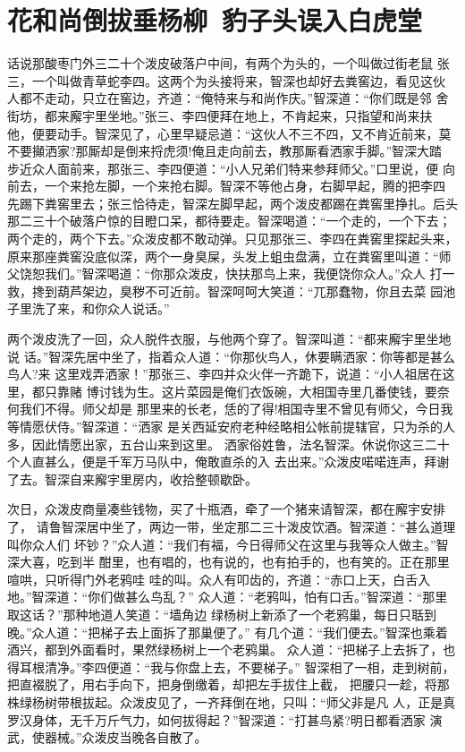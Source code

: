 \chapter{花和尚倒拔垂杨柳~豹子头误入白虎堂}

话说那酸枣门外三二十个泼皮破落户中间，有两个为头的，一个叫做过街老鼠
张三，一个叫做青草蛇李四。这两个为头接将来，智深也却好去粪窖边，看见这伙
人都不走动，只立在窖边，齐道：“俺特来与和尚作庆。”智深道：“你们既是邻
舍街坊，都来廨宇里坐地。”张三、李四便拜在地上，不肯起来，只指望和尚来扶
他，便要动手。智深见了，心里早疑忌道：“这伙人不三不四，又不肯近前来，莫
不要攧洒家?那厮却是倒来捋虎须!俺且走向前去，教那厮看洒家手脚。”智深大踏
步近众人面前来，那张三、李四便道：“小人兄弟们特来参拜师父。”口里说，便
向前去，一个来抢左脚，一个来抢右脚。智深不等他占身，右脚早起，腾的把李四
先踢下粪窖里去；张三恰待走，智深左脚早起，两个泼皮都踢在粪窖里挣扎。后头
那二三十个破落户惊的目瞪口呆，都待要走。智深喝道：“一个走的，一个下去；
两个走的，两个下去。”众泼皮都不敢动弹。只见那张三、李四在粪窖里探起头来，
原来那座粪窖没底似深，两个一身臭屎，头发上蛆虫盘满，立在粪窖里叫道：“师
父饶恕我们。”智深喝道：“你那众泼皮，快扶那鸟上来，我便饶你众人。”众人
打一救，搀到葫芦架边，臭秽不可近前。智深呵呵大笑道：“兀那蠢物，你且去菜
园池子里洗了来，和你众人说话。”

两个泼皮洗了一回，众人脱件衣服，与他两个穿了。智深叫道：“都来廨宇里坐地说
话。”智深先居中坐了，指着众人道：“你那伙鸟人，休要瞒洒家：你等都是甚么鸟人?来
这里戏弄洒家！”那张三、李四并众火伴一齐跪下，说道：“小人祖居在这里，都只靠赌
博讨钱为生。这片菜园是俺们衣饭碗，大相国寺里几番使钱，要奈何我们不得。师父却是
那里来的长老，恁的了得!相国寺里不曾见有师父，今日我等情愿伏侍。”智深道：“洒家
是关西延安府老种经略相公帐前提辖官，只为杀的人多，因此情愿出家，五台山来到这里。
洒家俗姓鲁，法名智深。休说你这三二十个人直甚么，便是千军万马队中，俺敢直杀的入
去出来。”众泼皮喏喏连声，拜谢了去。智深自来廨宇里房内，收拾整顿歇卧。

次日，众泼皮商量凑些钱物，买了十瓶酒，牵了一个猪来请智深，都在廨宇安排了，
请鲁智深居中坐了，两边一带，坐定那二三十泼皮饮酒。智深道：“甚么道理叫你众人们
坏钞？”众人道：“我们有福，今日得师父在这里与我等众人做主。”智深大喜，吃到半
酣里，也有唱的，也有说的，也有拍手的，也有笑的。正在那里喧哄，只听得门外老鸦哇
哇的叫。众人有叩齿的，齐道：“赤口上天，白舌入地。”智深道：“你们做甚么鸟乱？”
众人道：“老鸦叫，怕有口舌。”智深道：“那里取这话？”那种地道人笑道：“墙角边
绿杨树上新添了一个老鸦巢，每日只聒到晚。”众人道：“把梯子去上面拆了那巢便了。”
有几个道：“我们便去。”智深也乘着酒兴，都到外面看时，果然绿杨树上一个老鸦巢。
众人道：“把梯子上去拆了，也得耳根清净。”李四便道：“我与你盘上去，不要梯子。”
智深相了一相，走到树前，把直裰脱了，用右手向下，把身倒缴着，却把左手拔住上截，
把腰只一趁，将那株绿杨树带根拔起。众泼皮见了，一齐拜倒在地，只叫：“师父非是凡
人，正是真罗汉身体，无千万斤气力，如何拔得起？”智深道：“打甚鸟紧?明日都看洒家
演武，使器械。”众泼皮当晚各自散了。

